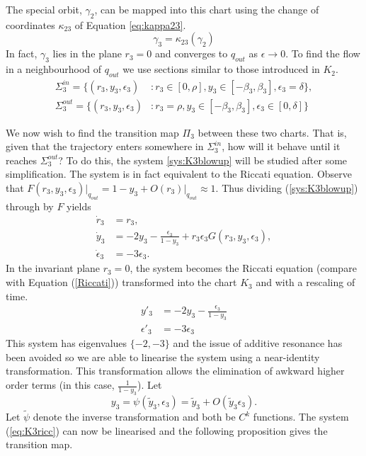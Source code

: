 The special orbit, $\gamma_2$, can be mapped into this chart using the change of coordinates $\kappa_{23}$ of Equation \ref{eq:kappa23}.
$$\gamma_3=\kappa_{23}(\gamma_2)$$
In fact, $\gamma_3$ lies in the plane $r_3=0$ and converges to $q_{out}$ as $\epsilon \to 0$. To find the flow in a neighbourhood of $q_{out}$ we use sections similar to those introduced in $K_2$.
\begin{align*} \Sigma_3^{in} =\lbrace(r_3,y_3,\epsilon_3) &: r_3\in[0,\rho], y_3 \in [-\beta_3,\beta_3], \epsilon_3=\delta\rbrace,\\
\Sigma_3^{out} =\lbrace(r_3,y_3,\epsilon_3) &: r_3=\rho, y_3 \in [-\beta_3,\beta_3], \epsilon_3\in[0,\delta]\rbrace
\end{align*}

We now wish to find the transition map $\Pi_3$ between these two charts. That is, given that the trajectory enters somewhere in $\Sigma_3^{in}$, how will it behave until it reaches $\Sigma_3^{out}$? To do this, the system \ref{sys:K3blowup} will be studied after some simplification. The system is in fact equivalent to the Riccati equation. Observe that $F(r_3,y_3,\epsilon_3)\big|_{q_{out}} = 1-y_3 + O(r_3)\big|_{q_{out}} \approx 1 $. Thus dividing (\ref{sys:K3blowup}) through by $F$ yields
\begin{subequations}
	\begin{align}
	\dot{r}_3&=r_3,\\
	\dot{y}_3&=-2y_3 - \frac{\epsilon_3}{1-y_3}+r_3\epsilon_3 G(r_3,y_3,\epsilon_3),\\
	\dot{\epsilon}_3 &= -3\epsilon_3.
	\end{align}
	\label{eq:K3ricc}
\end{subequations}
In the invariant plane $r_3=0$, the system becomes the Riccati equation (compare with Equation (\ref{Riccati})) transformed into the chart $K_3$ and with a rescaling of time.
\begin{align*}
y'_3 &= -2y_3-\frac{\epsilon_3}{1-y_3}\\
\epsilon'_3 &= -3\epsilon_3
\end{align*}
This system has eigenvalues $\lbrace -2,-3\rbrace$ and the issue of additive resonance has been avoided so we are able to linearise the system using a near-identity transformation. This transformation allows the elimination of awkward higher order terms (in this case, $\frac{1}{1-y_3}$). Let
$$y_3=\psi(\tilde{y}_3,\epsilon_3)=\tilde{y}_3+O(\tilde{y}_3\epsilon_3).$$
Let $\tilde{\psi}$ denote the inverse transformation and both be $C^k$ functions. The system (\ref{eq:K3ricc}) can now be linearised and the following proposition gives the transition map.

